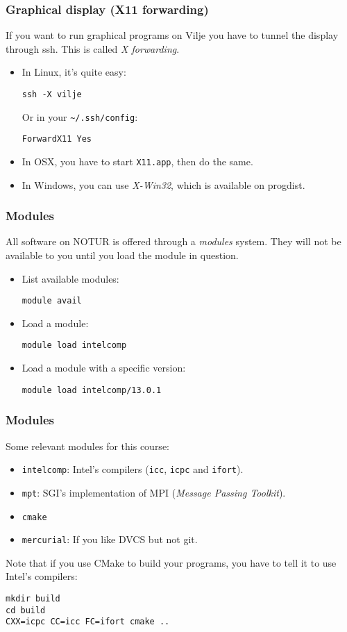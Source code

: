 \begin{frame}[fragile]
  \frametitle{Graphical display (X11 forwarding)}
  If you want to run graphical programs on Vilje you have to tunnel the display
  through ssh. This is called \emph{X forwarding}.
  \begin{itemize}
  \item In Linux, it's quite easy:
\begin{lstlisting}[style=shell]
ssh -X vilje
\end{lstlisting}
  Or in your \texttt{\textasciitilde/.ssh/config}:
\begin{lstlisting}[style=shell]
ForwardX11 Yes
\end{lstlisting}
    \item In OSX, you have to start \texttt{X11.app}, then do the same.
    \item In Windows, you can use \emph{X-Win32}, which is available on progdist.
  \end{itemize}
\end{frame}

\begin{frame}[fragile]
  \frametitle{Modules}
  All software on NOTUR is offered through a \emph{modules} system. They will
  not be available to you until you load the module in question.
  \begin{itemize}
  \item List available modules:
\begin{lstlisting}[style=shell]
module avail
\end{lstlisting}
  \item Load a module:
\begin{lstlisting}[style=shell]
module load intelcomp
\end{lstlisting}
  \item Load a module with a specific version:
\begin{lstlisting}[style=shell]
module load intelcomp/13.0.1
\end{lstlisting}
  \end{itemize}
\end{frame}

\begin{frame}[fragile]
  \frametitle{Modules}
  Some relevant modules for this course:
  \begin{itemize}
    \item \texttt{intelcomp}: Intel's compilers (\texttt{icc}, \texttt{icpc} and
      \texttt{ifort}).
    \item \texttt{mpt}: SGI's implementation of MPI (\emph{Message Passing
        Toolkit}).
    \item \texttt{cmake}
    \item \texttt{mercurial}: If you like DVCS but not git.
  \end{itemize}

  Note that if you use CMake to build your programs, you have to tell it to use
  Intel's compilers:
\begin{lstlisting}[style=shell]
mkdir build
cd build
CXX=icpc CC=icc FC=ifort cmake ..
\end{lstlisting}
\end{frame}

